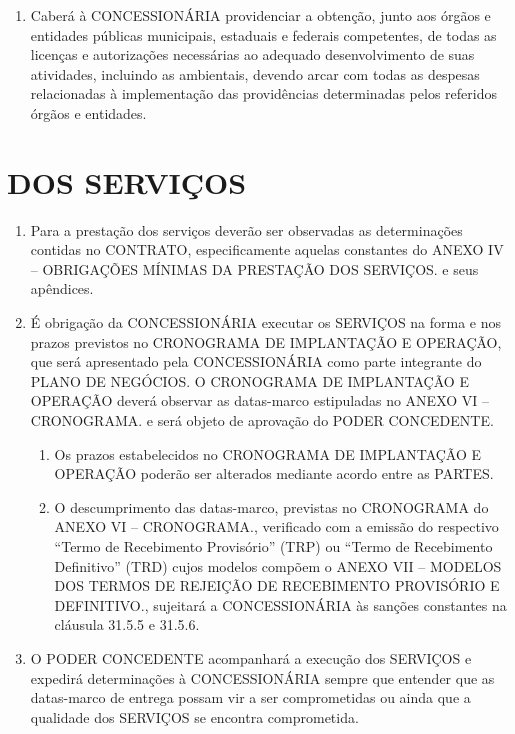 \documentclass[a4paper,11pt]{report} %
\begin{document}
\begin{enumerate}
\item \label{itm:MH6O} Caberá à CONCESSIONÁRIA providenciar a obtenção, junto aos órgãos e entidades públicas municipais, estaduais e federais competentes, de todas as licenças e autorizações necessárias ao adequado desenvolvimento de suas atividades, incluindo as ambientais, devendo arcar com todas as despesas relacionadas à implementação das providências determinadas pelos referidos órgãos e entidades.
\end{enumerate}

\section{DOS SERVIÇOS}
\label{sec:7TN8}

\begin{enumerate}
\item \label{itm:DQSD}	Para a prestação dos serviços deverão ser observadas as determinações contidas no CONTRATO, especificamente aquelas constantes do ANEXO IV – OBRIGAÇÕES MÍNIMAS DA PRESTAÇÃO DOS SERVIÇOS. e seus apêndices.

\item \label{itm:4HXB}	É obrigação da CONCESSIONÁRIA executar os SERVIÇOS na forma e nos prazos previstos no CRONOGRAMA DE IMPLANTAÇÃO E OPERAÇÃO, que será apresentado pela CONCESSIONÁRIA como parte integrante do PLANO DE NEGÓCIOS. O CRONOGRAMA DE IMPLANTAÇÃO E OPERAÇÃO deverá observar as datas-marco estipuladas no ANEXO VI – CRONOGRAMA. e será objeto de aprovação do PODER CONCEDENTE. 

\begin{enumerate}[label*=\arabic*.]
\item \label{itm:L34J}	Os prazos estabelecidos no CRONOGRAMA DE IMPLANTAÇÃO E OPERAÇÃO poderão ser alterados mediante acordo entre as PARTES.
\item \label{itm:SVW2} O descumprimento das datas-marco, previstas no CRONOGRAMA do ANEXO VI – CRONOGRAMA., verificado com a emissão do respectivo “Termo de Recebimento Provisório” (TRP) ou “Termo de Recebimento Definitivo” (TRD) cujos modelos compõem o ANEXO VII – MODELOS DOS TERMOS DE REJEIÇÃO DE RECEBIMENTO PROVISÓRIO E DEFINITIVO.,  sujeitará a CONCESSIONÁRIA às sanções constantes na cláusula 31.5.5 e 31.5.6.
\end{enumerate}

\item \label{itm:TYUV}	O PODER CONCEDENTE acompanhará a execução dos SERVIÇOS e expedirá determinações à CONCESSIONÁRIA sempre que entender que as datas-marco de entrega possam vir a ser comprometidas ou ainda que a qualidade dos SERVIÇOS se encontra comprometida.


\end{enumerate}
\end{document}
